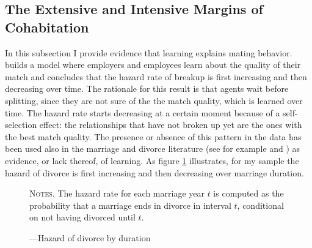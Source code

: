 \documentclass[12pt]{article}
\begin{document}
\subsection{The Extensive and Intensive Margins of Cohabitation}
In this subsection I provide evidence that learning explains mating behavior. \citet{jovanovic1979} builds a model where employers and employees learn about the quality of their match and concludes that the hazard rate of breakup is first increasing and then decreasing over time. The rationale for this result is that agents wait before splitting, since they are not sure of the the match quality, which is learned over time. The hazard rate starts decreasing at a certain moment because of a self-selection effect: the relationships that have not broken up yet are the ones with the best match quality. The presence or absence of this pattern in the data has been used also in the marriage and divorce literature (see for example \cite{brien2006} and \cite{marinescu2016}) as evidence, or lack thereof, of learning. As figure \ref{fig:hazard} illustrates, for my sample the hazard of divorce is first increasing and then decreasing over marriage duration.
\begin{figure}[h!]
	\centering
	\caption{---Hazard of divorce by duration}
	\label{fig:hazard}
	\hspace*{-1.1cm} 
	\resizebox{0.9\textwidth}{!}{}
	\begin{minipage}{0.99\textwidth} %
		
		\hspace{30em}
		
		{\footnotesize \textsc{Notes.}  The hazard rate for each marriage year $t$ is computed as the probability that a marriage ends in divorce in interval $t$, conditional on not having divorced until $t$.\par}
	\end{minipage}
\end{figure}
\end{document}

